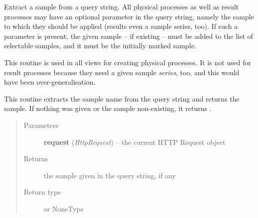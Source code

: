 \documentclass[a4paper,11pt,english]{sphinxmanual}
\begin{document}
\begin{fulllineitems}
\label{programming/utilities:samples.utils.views.extract_preset_sample}
Extract a sample from a query string.  All physical processes as well
as result processes may have an optional parameter in the query string,
namely the sample to which they should be applied (results even a sample
series, too).  If such a parameter is present, the given sample – if
existing – must be added to the list of selectable samples, and it must be
the initially marked sample.

This routine is used in all views for creating physical processes.  It is
not used for result processes because they need a given sample \emph{series},
too, and this would have been over-generalisation.

This routine extracts the sample name from the query string and returns the
sample.  If nothing was given or the sample non-existing, it returns
.
\begin{quote}\begin{description}
\item[{Parameters}] \leavevmode
\textbf{request} (\emph{HttpRequest}) -- the current HTTP Request object

\item[{Returns}] \leavevmode
the sample given in the query string, if any

\item[{Return type}] \leavevmode
{} or NoneType

\end{description}\end{quote}

\end{fulllineitems}

\end{document}
